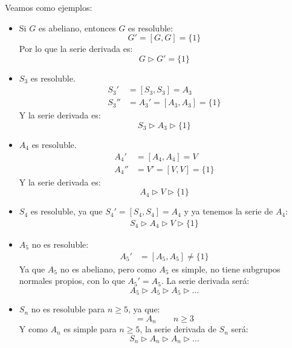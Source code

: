 \begin{ejemplo}
    Veamos como ejemplos:
    \begin{itemize}
        \item Si $G$ es abeliano, entonces $G$ es resoluble:
            \begin{equation*}
                G' = [G, G] = \{1\}
            \end{equation*}
            Por lo que la serie derivada es:
            \begin{equation*}
                G \rhd G' = \{1\}
            \end{equation*}
        \item $S_3$ es resoluble.
            \begin{align*}
                S_3' &= [S_3,S_3] = A_3 \\
                S_3'' &= A_3' = [A_3, A_3] = \{1\}
            \end{align*}
            Y la serie derivada es:
            \begin{equation*}
                S_3 \rhd A_3 \rhd \{1\}
            \end{equation*}
        \item $A_4$ es resoluble.
            \begin{align*}
                A_4' &= [A_4, A_4] = V \\
                A_4'' &= V' = [V, V] = \{1\}
            \end{align*}
            Y la serie derivada es:
            \begin{equation*}
                A_4 \rhd V \rhd \{1\}
            \end{equation*}
        \item $S_4$ es resoluble, ya que $S_4' = [S_4, S_4] = A_4$ y ya tenemos la serie de $A_4$:
            \begin{align*}
                S_4 \rhd A_4 \rhd V \rhd \{1\}
            \end{align*}
        \item $A_5$ no es resoluble:
            \begin{align*}
                A_5' &= [A_5, A_5] \neq \{1\}
            \end{align*}
            Ya que $A_5$ no es abeliano, pero como $A_5$ es simple, no tiene subgrupos normales propios, con lo que $A_5' = A_5$. La serie derivada será:
            \begin{equation*}
                A_5 \rhd A_5 \rhd A_5 \rhd \ldots
            \end{equation*}
        \item $S_n$ no es resoluble para $n\geq 5$, ya que:
            \begin{equation*}
                [S_n, S_n] = A_n  \qquad n\geq 3
            \end{equation*}
            Y como $A_n$ es simple para $n\geq 5$, la serie derivada de $S_n$ será:
            \begin{equation*}
                S_n \rhd A_n \rhd A_n \rhd \ldots
            \end{equation*}
    \end{itemize}
\end{ejemplo}
